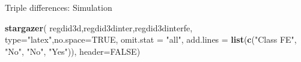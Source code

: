 \documentclass[
  ignorenonframetext,
]{beamer}
\newenvironment{Shaded}{\begin{snugshade}}{\end{snugshade}}
\newcommand{\AttributeTok}[1]{\textcolor[rgb]{0.13,0.29,0.53}{#1}}
\newcommand{\ConstantTok}[1]{\textcolor[rgb]{0.56,0.35,0.01}{#1}}
\newcommand{\FunctionTok}[1]{\textcolor[rgb]{0.13,0.29,0.53}{\textbf{#1}}}
\newcommand{\NormalTok}[1]{#1}
\newcommand{\StringTok}[1]{\textcolor[rgb]{0.31,0.60,0.02}{#1}}
\begin{document}
\begin{frame}[fragile]{Triple differences: Simulation}
\protect\hypertarget{triple-differences-simulation-3}{}
\tiny

\begin{Shaded}
\begin{Highlighting}[]
\FunctionTok{stargazer}\NormalTok{( regdid3d,regdid3dinter,regdid3dinterfe,}
           \AttributeTok{type=}\StringTok{"latex"}\NormalTok{,}\AttributeTok{no.space=}\ConstantTok{TRUE}\NormalTok{,  }\AttributeTok{omit.stat =} \StringTok{"all"}\NormalTok{,}
           \AttributeTok{add.lines =} \FunctionTok{list}\NormalTok{(}\FunctionTok{c}\NormalTok{(}\StringTok{"Class FE"}\NormalTok{, }\StringTok{"No"}\NormalTok{, }\StringTok{"No"}\NormalTok{, }\StringTok{"Yes"}\NormalTok{)),}
           \AttributeTok{header=}\ConstantTok{FALSE}\NormalTok{)}
\end{Highlighting}
\end{Shaded}


\end{frame}
\end{document}
